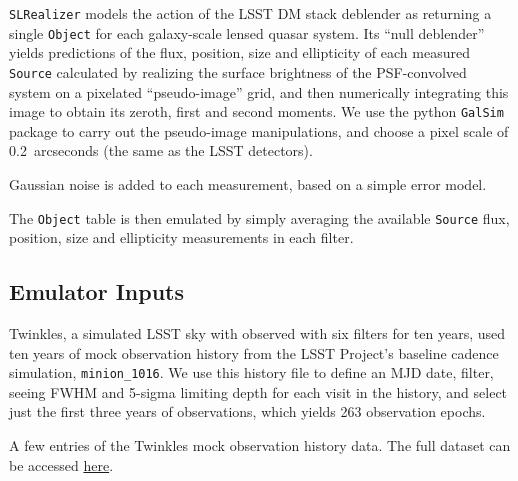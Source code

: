 \documentclass[\docopts]{\docclass}
\def\SLRealizer{\texttt{SLRealizer}\xspace}
\def\Object{\texttt{Object}\xspace}
\def\Source{\texttt{Source}\xspace}
\def\GalSim{\texttt{GalSim}\xspace}
\begin{document}
\SLRealizer models the action of the LSST DM stack deblender as
returning a single \Object for each galaxy-scale lensed quasar system.
Its ``null deblender'' yields predictions of the flux, position, size
and ellipticity of each measured \Source calculated by realizing the
surface brightness of the PSF-convolved system on a pixelated
``pseudo-image'' grid, and then numerically integrating this image to
obtain its zeroth, first and second moments. We use the python \GalSim
package to carry out the pseudo-image manipulations, and choose a pixel
scale of 0.2~arcseconds (the same as the LSST detectors).

Gaussian noise is added to each measurement, based on a simple error
model.

The \Object table is then emulated by simply averaging the available
\Source flux, position, size and ellipticity measurements in each
filter.


\subsection{Emulator Inputs}
\label{subsec:inputs}

Twinkles, a simulated LSST sky with observed with six filters for ten
years, used ten years of mock observation history from the LSST
Project's baseline cadence simulation, \texttt{minion\_1016}. We use
this history file to define an MJD date, filter, seeing FWHM and 5-sigma
limiting depth for each visit in the history, and select just the first
three years of observations, which yields 263 observation epochs.

\begin{table}[!h]
%
\caption{A few entries of the Twinkles mock observation history data.
The full dataset can be accessed
\href{https://github.com/LSSTDESC/SLRealizer/blob/master/data/twinkles_observation_history.csv}{here}.}
\end{table}
\end{document}
